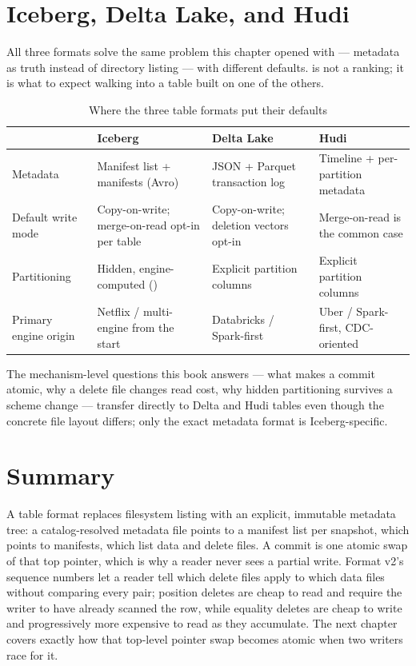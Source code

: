 \section{Iceberg, Delta Lake, and Hudi}
\label{sec:ice-comparison}

All three formats solve the same problem this chapter opened with ---
metadata as truth instead of directory listing --- with different defaults.
 is not a ranking; it is what to expect walking into
a table built on one of the others.

\begin{table}[htbp]
\centering
\caption{Where the three table formats put their defaults}
\label{tab:ice-comparison}
\begin{tabular}{@{}lP{3.3cm}P{3.3cm}P{3.3cm}@{}}
\toprule
 & \textbf{Iceberg} & \textbf{Delta Lake} & \textbf{Hudi} \\
\midrule
Metadata & Manifest list + manifests (Avro) & JSON + Parquet
  transaction log & Timeline + per-partition metadata \\
Default write mode & Copy-on-write; merge-on-read opt-in per table & Copy-on-write;
  deletion vectors opt-in & Merge-on-read is the common case \\
Partitioning & Hidden, engine-computed () & Explicit
  partition columns & Explicit partition columns \\
Primary engine origin & Netflix / multi-engine from the start & Databricks /
  Spark-first & Uber / Spark-first, CDC-oriented \\
\bottomrule
\end{tabular}
\end{table}

The mechanism-level questions this book answers --- what makes a commit
atomic, why a delete file changes read cost, why hidden partitioning survives
a scheme change --- transfer directly to Delta and Hudi tables even though
the concrete file layout differs; only the exact metadata format is
Iceberg-specific.

\section{Summary}
\label{sec:ice-spec-summary}

A table format replaces filesystem listing with an explicit, immutable
metadata tree: a catalog-resolved metadata file points to a manifest list per
snapshot, which points to manifests, which list data and delete files. A
commit is one atomic swap of that top pointer, which is why a reader never
sees a partial write. Format v2's sequence numbers let a reader tell which
delete files apply to which data files without comparing every pair;
position deletes are cheap to read and require the writer to have already
scanned the row, while equality deletes are cheap to write and progressively
more expensive to read as they accumulate. The next chapter covers exactly
how that top-level pointer swap becomes atomic when two writers race for it.

